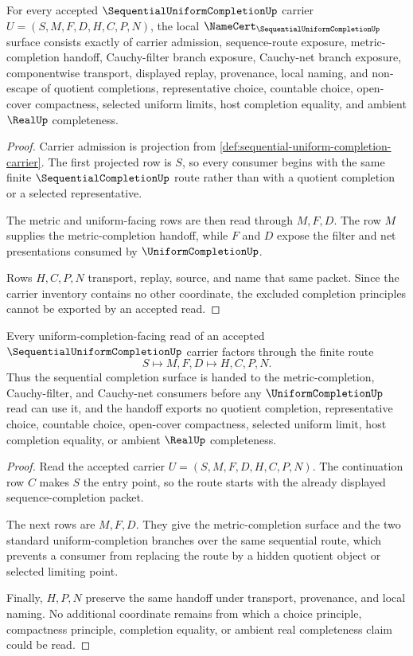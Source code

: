 \begin{theorem}
\label{thm:sequential-uniform-completion-namecert-obligations}
For every accepted $\SequentialUniformCompletionUp$ carrier $U=(S,M,F,D,H,C,P,N)$, the local $\NameCert_{\SequentialUniformCompletionUp}$ surface consists exactly of carrier admission, sequence-route exposure, metric-completion handoff, Cauchy-filter branch exposure, Cauchy-net branch exposure, componentwise transport, displayed replay, provenance, local naming, and non-escape of quotient completions, representative choice, countable choice, open-cover compactness, selected uniform limits, host completion equality, and ambient $\RealUp$ completeness.
\end{theorem}
\begin{proof}
Carrier admission is projection from \autoref{def:sequential-uniform-completion-carrier}. The first projected row is $S$, so every consumer begins with the same finite $\SequentialCompletionUp$ route rather than with a quotient completion or a selected representative.

The metric and uniform-facing rows are then read through $M,F,D$. The row $M$ supplies the metric-completion handoff, while $F$ and $D$ expose the filter and net presentations consumed by $\UniformCompletionUp$.

Rows $H,C,P,N$ transport, replay, source, and name that same packet. Since the carrier inventory contains no other coordinate, the excluded completion principles cannot be exported by an accepted read.
\end{proof}

\begin{theorem}
\label{thm:sequential-uniform-completion-branch-handoff}
Every uniform-completion-facing read of an accepted $\SequentialUniformCompletionUp$ carrier factors through the finite route
$$
S \longmapsto M,F,D \longmapsto H,C,P,N .
$$
Thus the sequential completion surface is handed to the metric-completion, Cauchy-filter, and Cauchy-net consumers before any $\UniformCompletionUp$ read can use it, and the handoff exports no quotient completion, representative choice, countable choice, open-cover compactness, selected uniform limit, host completion equality, or ambient $\RealUp$ completeness.
\end{theorem}
\begin{proof}
Read the accepted carrier $U=(S,M,F,D,H,C,P,N)$. The continuation row $C$ makes $S$ the entry point, so the route starts with the already displayed sequence-completion packet.

The next rows are $M,F,D$. They give the metric-completion surface and the two standard uniform-completion branches over the same sequential route, which prevents a consumer from replacing the route by a hidden quotient object or selected limiting point.

Finally, $H,P,N$ preserve the same handoff under transport, provenance, and local naming. No additional coordinate remains from which a choice principle, compactness principle, completion equality, or ambient real completeness claim could be read.
\end{proof}

